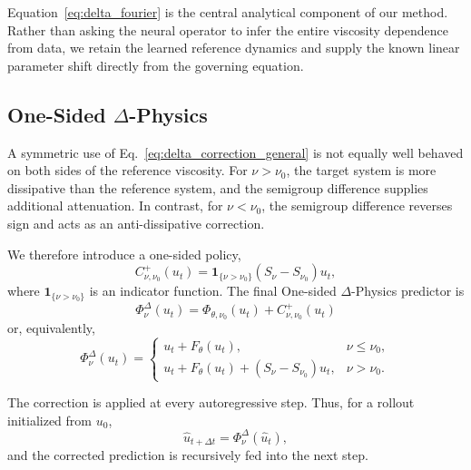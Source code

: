 \documentclass[10pt,twocolumn]{article}
\begin{document}
Equation~\eqref{eq:delta_fourier} is the central analytical component of our
method. Rather than asking the neural operator to infer the entire
viscosity dependence from data, we retain the learned reference dynamics and
supply the known linear parameter shift directly from the governing equation.

\subsection{One-Sided \texorpdfstring{$\Delta$}{Delta}-Physics}
\label{sec:one_sided_delta}

A symmetric use of Eq.~\eqref{eq:delta_correction_general} is not equally
well behaved on both sides of the reference viscosity. For
$\nu>\nu_0$, the target system is more dissipative than the reference system,
and the semigroup difference supplies additional attenuation. In contrast,
for $\nu<\nu_0$, the semigroup difference reverses sign and acts as an
anti-dissipative correction.

We therefore introduce a one-sided policy,
\begin{equation}
    C^{+}_{\nu,\nu_0}(u_t)
    =
    \mathbf{1}_{\{\nu>\nu_0\}}
    \left(S_\nu-S_{\nu_0}\right)u_t,
    \label{eq:onesided_correction}
\end{equation}
where $\mathbf{1}_{\{\nu>\nu_0\}}$ is an indicator function. The final
One-sided $\Delta$-Physics predictor is
\begin{equation}
    \boxed{
    \Phi^\Delta_{\nu}(u_t)
    =
    \Phi_{\theta,\nu_0}(u_t)
    +
    C^{+}_{\nu,\nu_0}(u_t)
    }
    \label{eq:delta_physics_final}
\end{equation}
or, equivalently,
\begin{equation}
    \Phi^\Delta_{\nu}(u_t)
    =
    \begin{cases}
        u_t+F_\theta(u_t),
        & \nu\le\nu_0,
        \\[2mm]
        u_t+F_\theta(u_t)
        +
        (S_\nu-S_{\nu_0})u_t,
        & \nu>\nu_0.
    \end{cases}
    \label{eq:delta_physics_piecewise}
\end{equation}

The correction is applied at every autoregressive step. Thus, for a rollout
initialized from $u_0$,
\begin{equation}
    \widehat{u}_{t+\Delta t}
    =
    \Phi^\Delta_{\nu}(\widehat{u}_t),
\end{equation}
and the corrected prediction is recursively fed into the next step.
\end{document}

